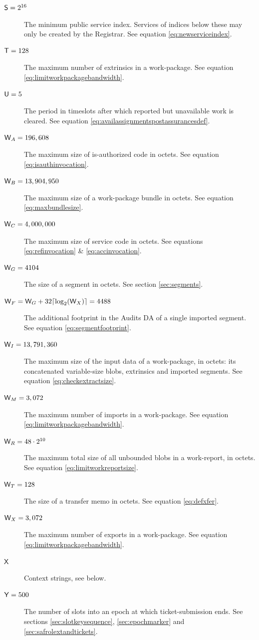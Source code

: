 \begin{description}
  \item[$\mathsf{S} = 2^{16}$] The minimum public service index. Services of indices below these may only be created by the Registrar. See equation \ref{eq:newserviceindex}.
  \item[$\mathsf{T} = 128$] The maximum number of extrinsics in a work-package. See equation \ref{eq:limitworkpackagebandwidth}.
  \item[$\mathsf{U} = 5$] The period in timeslots after which reported but unavailable work is cleared. See equation \ref{eq:availassignmentspostassurancesdef}.
  \item[$\mathsf{W}_A = 196,608$] The maximum size of is-authorized code in octets. See equation \ref{eq:isauthinvocation}.
  \item[$\mathsf{W}_B = 13,904,950$] The maximum size of a work-package bundle in octets. See equation \ref{eq:maxbundlesize}.
  \item[$\mathsf{W}_C = 4,000,000$] The maximum size of service code in octets. See equations \ref{eq:refinvocation} \& \ref{eq:accinvocation}.
  \item[$\mathsf{W}_G = 4104$] The size of a segment in octets. See section \ref{sec:segments}.
  \item[$\Csegmentfootprint = \Csegmentsize + 32\ceil{\log_2(\Cmaxpackageexports)} = 4488$] The additional footprint in the Audits DA of a single imported segment. See equation \ref{eq:segmentfootprint}.
  \item[$\mathsf{W}_I = 13,791,360$] The maximum size of the input data of a work-package, in octets: its concatenated variable-size blobs, extrinsics and imported segments. See equation \ref{eq:checkextractsize}.
  \item[$\mathsf{W}_M = 3,072$] The maximum number of imports in a work-package. See equation \ref{eq:limitworkpackagebandwidth}.
  \item[$\mathsf{W}_R = 48\cdot2^{10}$] The maximum total size of all unbounded blobs in a work-report, in octets. See equation \ref{eq:limitworkreportsize}.
  \item[$\mathsf{W}_T = 128$] The size of a transfer memo in octets. See equation \ref{eq:defxfer}.
  \item[$\mathsf{W}_X = 3,072$] The maximum number of exports in a work-package. See equation \ref{eq:limitworkpackagebandwidth}.
  \item[$\mathsf{X}$] Context strings, see below.
  \item[$\mathsf{Y} = 500$] The number of slots into an epoch at which ticket-submission ends. See sections \ref{sec:slotkeysequence}, \ref{sec:epochmarker} and \ref{sec:safrolextandtickets}.

\end{description}
